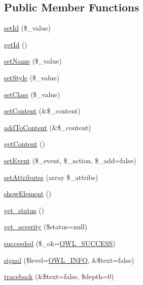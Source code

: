 \subsection*{Public Member Functions}
\begin{DoxyCompactItemize}
\item 
\hyperlink{classBaseElement_a0c1ce3d1684ecb78960cf7a97278494e}{setId} (\$\_\-value)
\item 
\hyperlink{classBaseElement_a4a7aa583ee21af392908d7fd42fde790}{getId} ()
\item 
\hyperlink{classBaseElement_a39bafb3609d10048920c20242c2a04c5}{setName} (\$\_\-value)
\item 
\hyperlink{classBaseElement_a6b2b9ff69f6e92db82f91d9c55cda697}{setStyle} (\$\_\-value)
\item 
\hyperlink{classBaseElement_af6597b30fa9798878f6290271043dfa2}{setClass} (\$\_\-value)
\item 
\hyperlink{classBaseElement_a164a9c6e4ee68afa0ad343942ba54d28}{setContent} (\&\$\_\-content)
\item 
\hyperlink{classBaseElement_abd48eef64ca4f419f26d66a0c0419908}{addToContent} (\&\$\_\-content)
\item 
\hyperlink{classBaseElement_af8c86b93bcdcfbc415bf96c622dc5516}{getContent} ()
\item 
\hyperlink{classBaseElement_ad5789f45f16aaa144716ee8558069c31}{setEvent} (\$\_\-event, \$\_\-action, \$\_\-add=false)
\item 
\hyperlink{classBaseElement_a7d8ddd64ceb3401a7cb84548656b3709}{setAttributes} (array \$\_\-attribs)
\item 
\hyperlink{classBaseElement_a63634d81fad745e3b72cda0100afebea}{showElement} ()
\item 
\hyperlink{class__OWL_a99ec771fa2c5c279f80152cc09e489a8}{get\_\-status} ()
\item 
\hyperlink{class__OWL_adf9509ef96858be7bdd9414c5ef129aa}{get\_\-severity} (\$status=null)
\item 
\hyperlink{class__OWL_ae76c46aff1ad253106332670fc59c777}{succeeded} (\$\_\-ok=\hyperlink{owl_8severitycodes_8php_a96223f06ba27bf5cbefa6e9d702897c2}{OWL\_\-SUCCESS})
\item 
\hyperlink{class__OWL_a51ba4a16409acf2a2f61f286939091a5}{signal} (\$level=\hyperlink{owl_8severitycodes_8php_a139328861128689f2f4def6a399d9057}{OWL\_\-INFO}, \&\$text=false)
\item 
\hyperlink{class__OWL_aa29547995d6741b7d2b90c1d4ea99a13}{traceback} (\&\$text=false, \$depth=0)
\end{DoxyCompactItemize}
